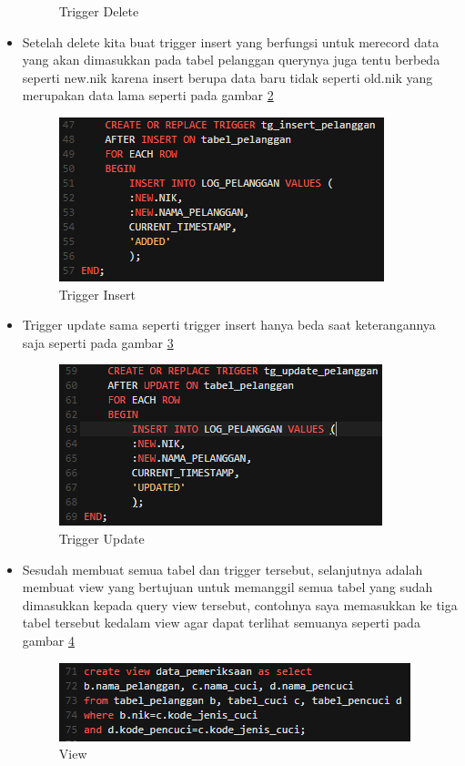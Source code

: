 \documentclass{article}
\begin{document}
\begin{itemize}
\begin{figure}[!htbp]
    \caption{Trigger Delete}
    \label{trigger1}
\end{figure}
\item Setelah delete kita buat trigger insert yang berfungsi untuk merecord data yang akan dimasukkan pada tabel pelanggan querynya juga tentu berbeda seperti new.nik karena insert berupa data baru tidak seperti old.nik yang merupakan data lama seperti pada gambar \ref{trigger2}
\begin{figure}[!htbp]
    \centering
    \includegraphics[scale=0.9]{figures/7.PNG}
    \caption{Trigger Insert}
    \label{trigger2}
\end{figure}
\item Trigger update sama seperti trigger insert hanya beda saat keterangannya saja seperti pada gambar \ref{trigger3}
\begin{figure}[!htbp]
    \centering
    \includegraphics[scale=0.9]{figures/8.PNG}
    \caption{Trigger Update}
    \label{trigger3}
\end{figure}
\item Sesudah membuat semua tabel dan trigger tersebut, selanjutnya adalah membuat view yang bertujuan untuk memanggil semua tabel yang sudah dimasukkan kepada query view tersebut, contohnya saya memasukkan ke tiga tabel tersebut kedalam view agar dapat terlihat semuanya seperti pada gambar \ref{view}
\begin{figure}[!htbp]
    \centering
    \includegraphics[scale=0.9]{figures/9.PNG}
    \caption{View}
    \label{view}
\end{figure}
\end{itemize}
\end{document}
